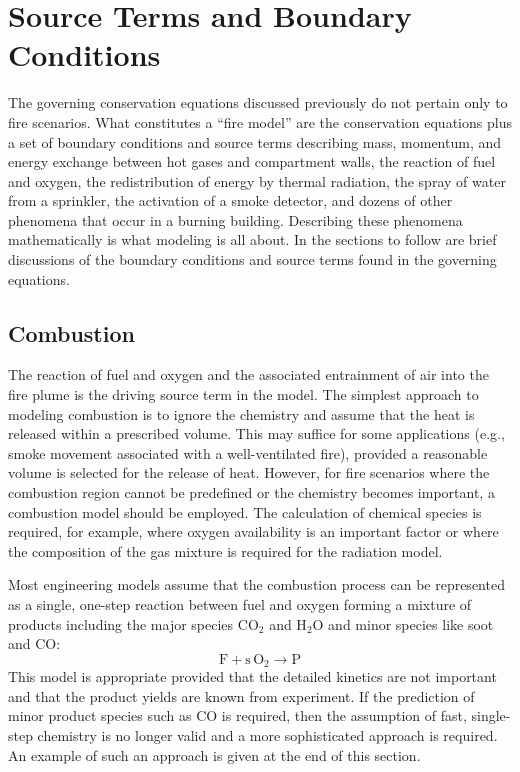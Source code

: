 \documentclass[graybox]{svmult}
\begin{document}
\section{Source Terms and Boundary Conditions}

The governing conservation equations discussed previously do not pertain only to fire scenarios. What constitutes a ``fire model'' are the conservation equations plus a set of boundary conditions and source terms describing mass, momentum, and energy exchange between hot gases and compartment walls, the reaction of fuel and oxygen, the redistribution of energy by thermal radiation, the spray of water from a sprinkler, the activation of a smoke detector, and dozens of other phenomena that occur in a burning building. Describing these phenomena mathematically is what modeling is all about. In the sections to follow are brief discussions of the boundary conditions and source terms found in the governing equations.

\subsection{Combustion}

The reaction of fuel and oxygen and the associated entrainment of air into the fire plume is the driving source term in the model. The simplest approach to modeling combustion is to ignore the chemistry and assume that the heat is released within a prescribed volume. This may suffice for some applications (e.g., smoke movement associated with a well-ventilated fire), provided a reasonable volume is selected for the release of heat. However, for fire scenarios where the combustion region cannot be predefined or the chemistry becomes important, a combustion model should be employed. The calculation of chemical species is required, for example, where oxygen availability is an important factor or where the composition of the gas mixture is required for the radiation model.

Most engineering models assume that the combustion process can be represented as a single, one-step reaction between fuel and oxygen forming a mixture of products including the major species CO$_2$ and H$_2$O and minor species like soot and CO:
\begin{equation}
\mathrm{F + s \, O_2 \rightarrow P}
\label{eq:simplereac}
\end{equation}
This model is appropriate provided that the detailed kinetics are not important and that the product yields are known from experiment. If the prediction of minor product species such as CO is required, then the assumption of fast, single-step chemistry is no longer valid and a more sophisticated approach is required. An example of such an approach is given at the end of this section.
\end{document}
